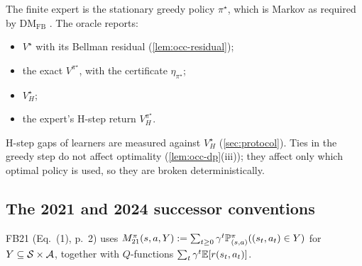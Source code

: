 \begin{remark}
The finite expert is the stationary greedy policy $\pi^\star$, which is Markov as required by DM$_{\mathrm{FB}}$ .
The oracle reports:
\begin{itemize}[nosep]
\item $V^\star$ with its Bellman residual (\cref{lem:occ-residual});
\item the exact $V^{\pi^\star}$, with the certificate $\eta_{\pi^\star}$;
\item $V^\star_H$;
\item the expert's H-step return $V^{\pi^\star}_H$.
\end{itemize}
H-step gaps of learners are measured against $V^\star_H$ (\cref{sec:protocol}).
Ties in the greedy step do not affect optimality (\cref{lem:occ-dp}(iii)); they affect only which optimal policy is used, so they are broken deterministically.
\end{remark}

\subsection{The 2021 and 2024 successor conventions}\label{sec:occ-conv}

FB21 (Eq.~(1), p.~2) uses $M^\pi_{21}(s,a,Y):=\sum_{t\ge0}\gamma^t\mathbb{P}^\pi_{(s,a)}((s_t,a_t)\in Y)$ for $Y\subseteq\mathcal{S}\times\mathcal{A}$, together with $Q$-functions $\sum_t\gamma^t\mathbb{E}[r(s_t,a_t)]$.


